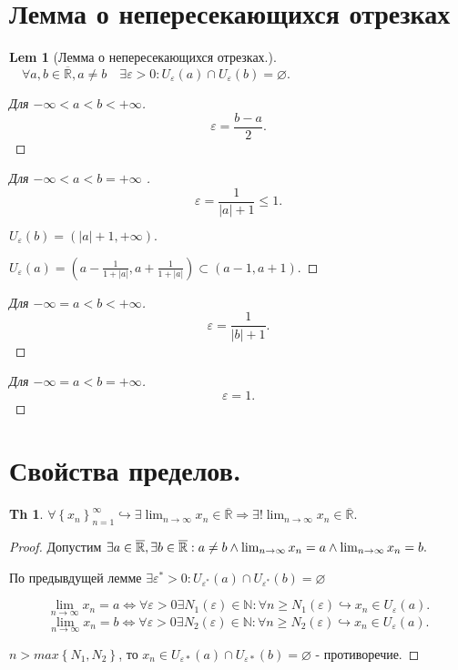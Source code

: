 \documentclass[a5paper, 10pt]{article}
\theoremstyle{plain}
\newtheorem*{theorem}{Th}
\newtheorem*{lemma}{Lem}
\newcommand{\N}{\mathbb N}
\newcommand{\eps}{\varepsilon}
\newcommand{\Ro}{\overline{\mathbb R}}
\newcommand{\hrarrow}{\hookrightarrow}
\newcommand{\Rarrow}{\Rightarrow}
\newcommand{\Lrarrow}{\Leftrightarrow}
\begin{document}
    \section{Лемма о непересекающихся отрезках}
    \begin{lemma}[Лемма о непересекающихся отрезках.]
        $ \quad \forall a, b \in \Ro, a \neq b \quad \exists \eps > 0:
        U_{\eps}(a) \cap U_{\eps}(b) = \varnothing. $
    \end{lemma}

    \begin{proof}[Для $ -\infty < a < b < +\infty $]
        \[ \eps = \frac{b - a}{2}. \]
    \end{proof}

    \begin{proof}[Для $ -\infty < a < b = +\infty $ ]

        \[ \eps = \frac{1}{\left| a \right| + 1} \leq 1.\]

        $ U_{\eps}(b) = (\left| a \right| + 1, +\infty). $

        $ U_{\eps}(a) = \left( a - \frac{1}{1 + \left| a \right|}, a + \frac{1}{1 + |a|}  \right)
        \subset (a - 1, a + 1). $
    \end{proof}

    \begin{proof}[Для $ -\infty = a < b < +\infty $]
        \[ \eps = \frac{1}{\left| b \right| + 1}. \]
    \end{proof}

    \begin{proof}[Для $ -\infty = a < b = +\infty $]
        \[ \eps = 1. \]
    \end{proof}

    \section{Свойства пределов.}

    \begin{theorem}
        $ \forall \left\{x_n \right\}_{n = 1}^{\infty} \hrarrow
        \exists \lim_{n \to \infty} x_n \in \Ro \Rarrow
        \exists! \lim_{n \to \infty} x_n \in \Ro. $
    \end{theorem}

    \begin{proof}
        Допустим $ \exists a \in \Ro, \exists b \in \Ro: \newline
        a \neq b \land \lim_{n \to \infty} x_n = a \land \lim_{n \to \infty} x_n = b. $

        По предывдущей лемме $ \exists \eps^{*}  > 0: U_{\eps^{*}}(a) \cap U_{\eps^{*} }(b)
        = \varnothing $

        \[ \lim_{n \to \infty} x_n = a \Lrarrow \forall \eps > 0 \exists N_1(\eps) \in \N:
        \forall n \geq N_1(\eps) \hrarrow x_n \in U_{\eps}(a). \]
        \[ \lim_{n \to \infty} x_n = b \Lrarrow \forall \eps > 0 \exists N_2(\eps) \in \N:
        \forall n \geq N_2(\eps) \hrarrow x_n \in U_{\eps}(a). \]

        $ n > max \left\{ N_1, N_2 \right\} $, то $ x_n \in U_{\eps*}(a) \cap U_{\eps*}(b) =
        \varnothing $ - противоречие.
    \end{proof}
\end{document}
